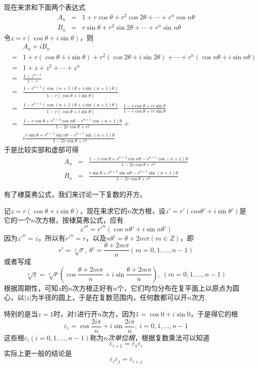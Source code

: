 \begin{example}
  现在来求和下面两个表达式
  \begin{eqnarray*}
    A_n & = & 1 + r\cos{\theta} + r^2\cos{2\theta}+\cdots+r^n\cos{n\theta} \\
    B_n & = & r\sin{\theta} + r^2\sin{2\theta} + \cdots + r^n\sin{n\theta}
  \end{eqnarray*}
  令$z=r(\cos{\theta}+i\sin{\theta})$，则
  \begin{eqnarray*}
   && A_n+iB_n \\ 
   & = & 1 + r(\cos{\theta}+i\sin{\theta})+r^2(\cos{2\theta}+i\sin{2\theta})+\cdots+r^n(\cos{n\theta}+i\sin{n\theta}) \\
   & = & 1+ z + z^2 + \cdots + z^n \\
   & = & \frac{1-z^{n+1}}{1-z} \\
    & = & \frac{1-r^{n+1}(\cos{(n+1)\theta}+i\sin{(n+1)\theta})}{1-r(\cos{\theta}+i\sin{\theta})} \\
       & = & \frac{1-r^{n+1}(\cos{(n+1)\theta}+i\sin{(n+1)\theta})}{1-r(\cos{\theta}+i\sin{\theta})} \cdot \frac{1-r\cos{\theta}+ir\sin{\theta}}{1-r\cos{\theta}+ir\sin{\theta}} \\
   & = & \frac{1-r\cos{\theta}+r^{n+2}\cos{n\theta}-r^{n+1}\cos{(n+1)\theta}}{1-2r\cos{\theta}+r^2} + \\
    && i \frac{r\sin{\theta}+r^{n+2}\sin{n\theta}-r^{n+1}\sin{(n+1)\theta}}{1-2r\cos{\theta}+r^2}
  \end{eqnarray*}
  于是比较实部和虚部可得
  \begin{eqnarray*}
    A_n & = & \frac{1-r\cos{\theta}+r^{n+2}\cos{n\theta}-r^{n+1}\cos{(n+1)\theta}}{1-2r\cos{\theta}+r^2} \\
    B_n & = & \frac{r\sin{\theta}+r^{n+2}\sin{n\theta}-r^{n+1}\sin{(n+1)\theta}}{1-2r\cos{\theta}+r^2}
  \end{eqnarray*}
\end{example}

有了棣莫弗公式，我们来讨论一下复数的开方。

记$z=r(\cos{\theta}+i\sin{\theta})$，现在来求它的$n$次方根，设$z'=r'(cos{\theta'+i\sin{\theta'}})$是它的一个$n$次方根，按棣莫弗公式，应有
\[ z'^n=r'^n(\cos{n\theta'}+i\sin{n\theta'}) \]
因为$z'^n=z$，所以有$r'^n=r$，以及$n\theta'=\theta+2m\pi(m \in Z)$，即
\[ r'=\sqrt[n]{r}, \  \theta'=\frac{\theta+2m\pi}{n}(m=0,1,\ldots,n-1) \]
或者写成
\[ \sqrt[n]{z}=\sqrt[n]{r} \left( \cos{\frac{\theta+2m\pi}{n}}+i\sin{\frac{\theta+2m\pi}{n}} \right), \  (m=0,1,\ldots,n-1) \]
根据周期性，可知$z$的$n$次方根正好有$n$个，它们均匀分布在复平面上以原点为圆心，以$|z|$为半径的圆上，于是在复数范围内，任何数都可以开$n$次方.


特别的是当$z=1$时，对1进行开$n$次方，因为$1=\cos{0}+i\sin{0}$，于是得它的根
\[ \varepsilon_i = \cos{\frac{2i\pi}{n}}+i\sin{\frac{2i\pi}{n}}, \  i=0,1,\ldots,n-1 \]
这些根$\varepsilon_i(i=0,1,\ldots,n-1)$称为\emph{$n$次单位根}，根据复数乘法可以知道
\[ \varepsilon_{i+1} = \varepsilon_1 \varepsilon_i \]
实际上更一般的结论是
\[ \varepsilon_i \varepsilon_j = \varepsilon_{i+j} \]



